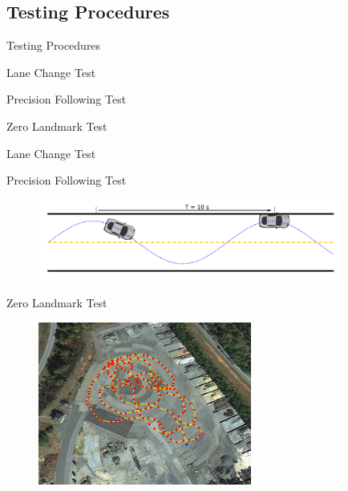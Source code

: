 \documentclass{beamer}
\begin{document}
  \subsection{Testing Procedures}

    \begin{frame}{Testing Procedures}
    
      Lane Change Test

      Precision Following Test
      
      Zero Landmark Test

    \end{frame}

    \begin{frame}{Lane Change Test}
      \begin{figure}
        
      \end{figure}
    \end{frame}

    \begin{frame}{Precision Following Test}
      \begin{figure}
        \includegraphics[width=10cm]{../graphics/precision_following_diagram.png}
      \end{figure}   
    \end{frame}

    \begin{frame}{Zero Landmark Test}
      \begin{figure}
        \includegraphics[width=7cm]{../graphics/zero_landmark_path.png}
      \end{figure}
    \end{frame}
\end{document}
